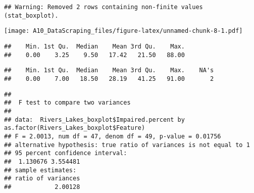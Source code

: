 \documentclass[]{article}
\newenvironment{Shaded}{\begin{snugshade}}{\end{snugshade}}
\newcommand{\CommentTok}[1]{\textcolor[rgb]{0.56,0.35,0.01}{\textit{#1}}}
\newcommand{\DataTypeTok}[1]{\textcolor[rgb]{0.13,0.29,0.53}{#1}}
\newcommand{\KeywordTok}[1]{\textcolor[rgb]{0.13,0.29,0.53}{\textbf{#1}}}
\newcommand{\NormalTok}[1]{#1}
\newcommand{\OperatorTok}[1]{\textcolor[rgb]{0.81,0.36,0.00}{\textbf{#1}}}
\newcommand{\OtherTok}[1]{\textcolor[rgb]{0.56,0.35,0.01}{#1}}
\newcommand{\StringTok}[1]{\textcolor[rgb]{0.31,0.60,0.02}{#1}}
\begin{document}
\begin{verbatim}
## Warning: Removed 2 rows containing non-finite values (stat_boxplot).
\end{verbatim}

\texttt{[image: A10\_DataScraping\_files/figure-latex/unnamed-chunk-8-1.pdf]}

\begin{Shaded}
\end{Shaded}

\begin{verbatim}
##    Min. 1st Qu.  Median    Mean 3rd Qu.    Max. 
##    0.00    3.25    9.50   17.42   21.50   88.00
\end{verbatim}

\begin{Shaded}
\end{Shaded}

\begin{verbatim}
##    Min. 1st Qu.  Median    Mean 3rd Qu.    Max.    NA's 
##    0.00    7.00   18.50   28.19   41.25   91.00       2
\end{verbatim}

\begin{Shaded}
\end{Shaded}

\begin{verbatim}
## 
##  F test to compare two variances
## 
## data:  Rivers_Lakes_boxplot$Impaired.percent by as.factor(Rivers_Lakes_boxplot$Feature)
## F = 2.0013, num df = 47, denom df = 49, p-value = 0.01756
## alternative hypothesis: true ratio of variances is not equal to 1
## 95 percent confidence interval:
##  1.130676 3.554481
## sample estimates:
## ratio of variances 
##            2.00128
\end{verbatim}
\end{document}
